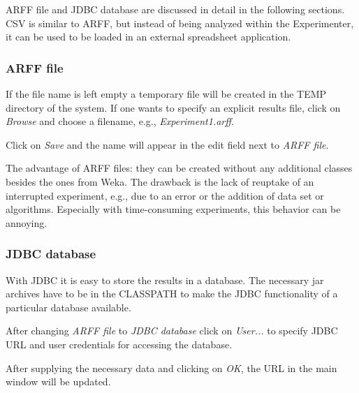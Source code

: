 \documentclass[a4paper]{article}
\begin{document}
ARFF file and JDBC database are discussed in detail in the following sections. CSV is similar to ARFF, but instead of being analyzed within the Experimenter, it can be used to be loaded in an external spreadsheet application.


\subsubsection*{ARFF file}

If the file name is left empty a temporary file will be created in the TEMP directory of the system. If one wants to specify an explicit results file, click on \textit{Browse} and choose a filename, e.g., \textit{Experiment1.arff}.

\begin{center}
\end{center}


Click on \textit{Save} and the name will appear in the edit field next to \textit{ARFF file}.

\begin{center}
\end{center}


The advantage of ARFF files: they can be created without any additional classes besides the ones from Weka. The drawback is the lack of reuptake of an interrupted experiment, e.g., due to an error or the addition of data set or algorithms. Especially with time-consuming experiments, this behavior can be annoying.


\subsubsection*{JDBC database}

With JDBC it is easy to store the results in a database. The necessary jar archives have to be in the CLASSPATH to make the JDBC functionality of a particular database available.

After changing \textit{ARFF file} to \textit{JDBC database} click on \textit{User...} to specify JDBC URL and user credentials for accessing the database.

\begin{center}
\end{center}


After supplying the necessary data and clicking on \textit{OK}, the URL in the main window will be updated.
\end{document}
